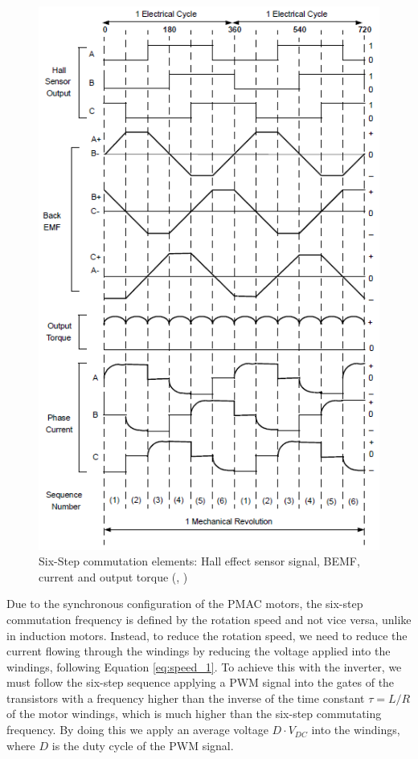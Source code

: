 \begin{figure}[htbp]
\centering
\includegraphics[width=\textwidth]{Images/6step.png} 
\caption[Six Step Commutation]{Six-Step commutation elements: Hall effect sensor signal, BEMF, current and output torque  (\citeauthor{microchipBLDC}, \citeyear{microchipBLDC})}
\label{fig:six_step}
\end{figure}

Due to the synchronous configuration of the \ac{PMAC} motors, the six-step commutation frequency is defined by the rotation speed and not vice versa, unlike in induction motors. Instead, to reduce the rotation speed, we need to reduce the current flowing through the windings by reducing the voltage applied into the windings, following Equation \ref{eq:speed_1}. To achieve this with the inverter, we must follow the six-step sequence applying a \ac{PWM} signal into the gates of the transistors with a frequency higher than the inverse of the time constant $\tau = L/R$ of the motor windings, which is much higher than the six-step commutating frequency. By doing this we apply an average voltage $D\cdot V_{DC}$ into the windings, where $D$ is the duty cycle of the \ac{PWM} signal.

